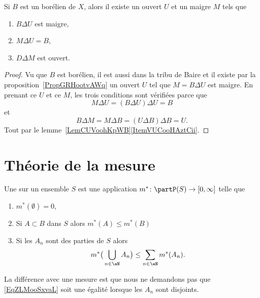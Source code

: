 \begin{proposition}
    Si \( B\) est un borélien de \( X\), alors il existe un ouvert \( U\) et un maigre \( M\) tels que
    \begin{enumerate}
        \item
            \( B\Delta U\) est maigre,
        \item
            \( M\Delta U=B\),
        \item
            \( D\Delta M\) est ouvert.
    \end{enumerate}
\end{proposition}

\begin{proof}
    Vu que \( B\) est borélien, il est aussi dans la tribu de Baire et il existe par la proposition~\ref{PropGRHootvAWq} un ouvert \( U\) tel que \( M=B\Delta U\) est maigre. En prenant ce \( U\) et ce \( M\), les trois conditions sont vérifiées parce que
    \begin{equation}
        M\Delta U=(B\Delta U)\Delta U=B
    \end{equation}
    et
    \begin{equation}
        B\Delta M=M\Delta B=(U\Delta B)\Delta B=U.
    \end{equation}
    Tout par le lemme~\ref{LemCUVoohKpWB}\ref{ItemVUCooHAztCii}.
\end{proof}

\section{Théorie de la mesure}
\label{SecSLOooeMaig}

\begin{definition} \label{DefUMWoolmMaf}
    Une  sur un ensemble \( S\) est une application \( m^*\colon \partP(S)\to \mathopen[ 0 , \infty \mathclose]\) telle que
    \begin{enumerate}
        \item
            \( m^*(\emptyset)=0\),
        \item
            Si \( A\subset B\) dans \( S\) alors \( m^*(A)\leq m^*(B)\)
        \item   \label{ItemARKooppZfDaiii}
            Si les \( A_n\) sont des parties de \( S\) alors
            \begin{equation}    \label{EqZLMooSxvaL}
                m^*\big( \bigcup_{n\in \eN}A_n \big)\leq \sum_{n\in \eN}m^*(A_n).
            \end{equation}
    \end{enumerate}
\end{definition}
La différence avec une mesure est que nous ne demandons pas que \eqref{EqZLMooSxvaL} soit une égalité lorsque les \( A_n\) sont disjoints.

